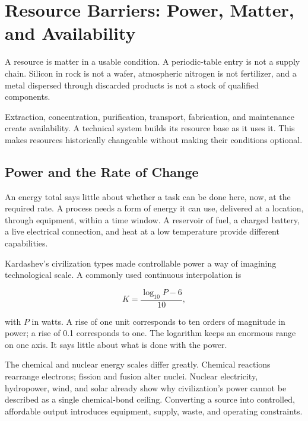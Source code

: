 \section{Resource Barriers: Power, Matter, and Availability}

A resource is matter in a usable condition. A periodic-table entry is not a supply chain. Silicon in rock is not a wafer, atmospheric nitrogen is not fertilizer, and a metal dispersed through discarded products is not a stock of qualified components.

Extraction, concentration, purification, transport, fabrication, and maintenance create availability. A technical system builds its resource base as it uses it. This makes resources historically changeable without making their conditions optional.

\subsection{Power and the Rate of Change}


An energy total says little about whether a task can be done here, now, at the required rate. A process needs a form of energy it can use, delivered at a location, through equipment, within a time window. A reservoir of fuel, a charged battery, a live electrical connection, and heat at a low temperature provide different capabilities.

Kardashev's civilization types made controllable power a way of imagining technological scale.\cite{kardashev1964transmission} A commonly used continuous interpolation is

\begin{equation}
K=\frac{\log_{10}P-6}{10},
\label{eq:kardashev}
\end{equation}

with $P$ in watts. A rise of one unit corresponds to ten orders of magnitude in power; a rise of 0.1 corresponds to one. The logarithm keeps an enormous range on one axis. It says little about what is done with the power.

The chemical and nuclear energy scales differ greatly. Chemical reactions rearrange electrons; fission and fusion alter nuclei. Nuclear electricity, hydropower, wind, and solar already show why civilization's power cannot be described as a single chemical-bond ceiling.\cite{jaffe2018physics,smil2017energy} Converting a source into controlled, affordable output introduces equipment, supply, waste, and operating constraints.

